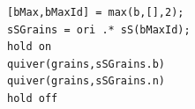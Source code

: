 \documentclass[compress]{beamer}
\begin{document}
\begin{frame}[fragile]
\begin{columns}
\begin{column}{0.62\textwidth}
      \pause

      \begin{lstlisting}[style=input]
[bMax,bMaxId] = max(b,[],2);
sSGrains = ori .* sS(bMaxId);
hold on
quiver(grains,sSGrains.b)
quiver(grains,sSGrains.n)
hold off
\end{lstlisting}


    \end{column}
     \begin{column}{0.35\textwidth}

\end{column}
\end{columns}
\end{frame}
\end{document}
